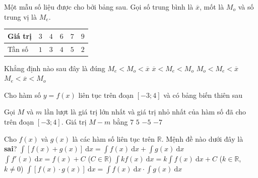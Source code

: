 \begin{ex}
	Một mẫu số liệu được cho bởi bảng sau. Gọi số trung bình là $\overline{x}$, mốt là $M_o$ và số trung vị là $M_e$.
	\begin{center}
		\begin{tabular}{|l|c|c|c|c|c|}
			\hline
			Giá trị & $3$ & $4$ & $6$ & $7$ & $9$ \\
			\hline
			Tần số & $1$ & $3$ & $4$ & $5$ & $2$ \\
			\hline
		\end{tabular}
	\end{center}
	Khẳng định nào sau đây là đúng
	\choice
	{$M_e<M_o<\overline{x}$}
	{$\overline{x}<M_e<M_o$}
	{$M_o<M_e<\overline{x}$}
	{\True$M_e<\overline{x}<M_o$}
\end{ex}

\begin{ex}
	Cho hàm số $y=f(x)$ liên tục trên đoạn $[-3;4]$ và có bảng biến thiên sau
	\begin{center}
	\end{center}
	Gọi $M$ và $m$ lần lượt là giá trị lớn nhất và giá trị nhỏ nhất của hàm số đã cho trên đoạn $[-3;4]$. Giá trị $M-m$ bằng
	\choice
		{\True$7$}
		{$5$}
		{$-5$}
		{$-7$}
\end{ex}

\begin{ex}
	Cho $f(x)$ và $g(x)$ là các hàm số liên tục trên $\mathbb{R}$. Mệnh đề nào dưới đây là \textbf{sai}?
	\choice
		{$\displaystyle\int [f(x)+g(x)]\mathrm{~d}x=\displaystyle\int f(x)\mathrm{~d}x+\displaystyle\int g(x)\mathrm{~d}x$}
		{$\displaystyle\int f'(x)\mathrm{~d}x=f(x)+C$ ($C\in \mathbb{R}$)}
		{$\displaystyle\int kf(x)\mathrm{~d}x=k\displaystyle\int f(x)\mathrm{~d}x+C$ ($k\in \mathbb{R}$, $k\ne0$)}
		{\True$\displaystyle\int [f(x)\cdot g(x)]\mathrm{~d}x=\displaystyle\int f(x)\mathrm{~d}x\cdot \displaystyle\int g(x)\mathrm{~d}x$}
\end{ex}

